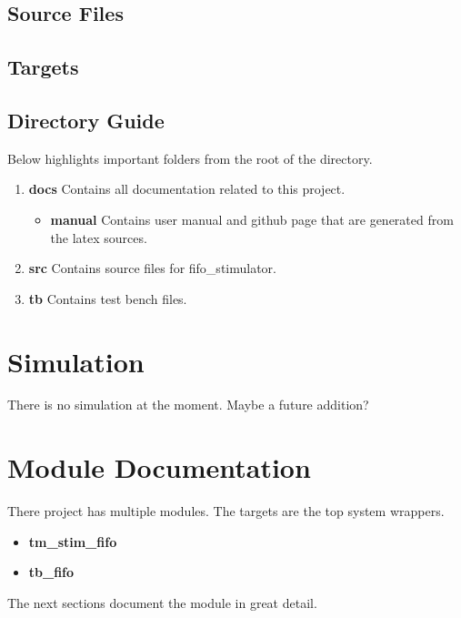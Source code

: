 \subsection{Source Files}



\subsection{Targets} \label{targets}



\subsection{Directory Guide}

\par
Below highlights important folders from the root of the directory.

\begin{enumerate}
  \item \textbf{docs} Contains all documentation related to this project.
    \begin{itemize}
      \item \textbf{manual} Contains user manual and github page that are generated from the latex sources.
    \end{itemize}
  \item \textbf{src} Contains source files for fifo\_stimulator.
  \item \textbf{tb} Contains test bench files.
\end{enumerate}

\newpage

\section{Simulation}
\par
There is no simulation at the moment. Maybe a future addition?

\newpage

\section{Module Documentation} \label{Module Documentation}

\par
There project has multiple modules. The targets are the top system wrappers.

\begin{itemize}
\item \textbf{tm\_stim\_fifo}
\item \textbf{tb\_fifo}
\end{itemize}
The next sections document the module in great detail.

